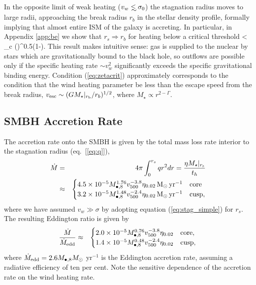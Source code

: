 \documentclass[usenatbib,fleqn]{mn2e}
\newcommand\lsim{\mathrel{\rlap{\lower4pt\hbox{\hskip1pt$\sim$}}
    \raise1pt\hbox{$<$}}}
\newcommand{\rs}{r_s}
\newcommand{\rb}{r_b}
\newcommand{\Mbheight}{M_{\bullet,8}}
\newcommand{\soi}{\rm inf}
\newcommand{\rsoi}{r_{\soi}}
\newcommand{\pyear}{{\rm yr}^{-1}}
\renewcommand{\th}{t_h}
\begin{document}
In the opposite limit of weak heating ($v_w\lsim \sigma_0$) the
stagnation radius moves to large radii, approaching the break radius
$\rb$ in the stellar density profile, formally implying that almost
entire ISM of the galaxy is accreting.  In particular, in Appendix
\ref{app:be} we show that $\rs \Rightarrow \rb$ for heating below a
critical threshold \be \zeta\equiv {} <
\zeta_c \approx \left(\frac{\rb}{\rsoi}\right)^{0.5(1-\Gamma)}.
\label{eq:zetacrit}
\ee This result makes intuitive sense: gas is supplied to the nuclear
by stars which are gravitationally bound to the black hole, so
outflows are possible only if the specific heating rate $\sim
v_{w}^{2}$ significantly exceeds the specific gravitational binding
energy.  Condition (\ref{eq:zetacrit}) approximately corresponds to
the condition that the wind heating parameter be less than the escape
speed from the break radius, $v_{\rm esc} \sim (GM_{\star}|_{r_{\rm
    b}}/r_b)^{1/2}$, where $M_{\star} \propto r^{2-\Gamma}$.

\subsection{SMBH Accretion Rate}

The accretion rate onto the SMBH is given by the total mass loss rate interior to the stagnation radius (eq.~[\ref{eq:q}]), 
\begin{eqnarray}
  \dot{M} &=& 4\pi \int_{0}^{r_{s}}q r^{2}dr = \frac{\eta M_{\star}|_{r_{\rm s}}}{\th} \nonumber \\
&\approx&
  \begin{cases}
    4.5 \times 10^{-5} M_{\bullet,8}^{1.76}
    v_{500}^{-3.8}  \eta_{0.02} \Msun \, \pyear& \text{core} \\
    3.2 \times 10^{-5} M_{\bullet,8}^{1.48} 
    v_{500}^{-2.4}  \eta_{0.02} \Msun \, \pyear  & \text{cusp}, 
  \end{cases}
  \label{eq:mdot_analytic}
\end{eqnarray}
where we have assumed $v_{w} \gg \sigma$ by adopting equation
(\ref{eq:stag_simple}) for $r_s$.  The resulting Eddington ratio is
given by
\begin{eqnarray}
\frac{\dot{M}}{\dot{M}_{\rm edd}} &\approx&
  \begin{cases}
    2.0 \times 10^{-5} M_{\bullet,8}^{0.76}
    v_{500}^{-3.8}  \eta_{0.02}   & \text{core}, \\
    1.4 \times 10^{-5} \Mbheight^{0.48} 
    v_{500}^{-2.4}  \eta_{0.02}   & \text{cusp}, 
  \end{cases}
  \label{eq:eddr_analytic}
\end{eqnarray}
where $\dot{M}_{\rm edd} = 2.6M_{\bullet,8}M_{\odot}$ yr$^{-1}$ is the
Eddington accretion rate, assuming a radiative efficiency of ten per
cent.  Note the sensitive dependence of the accretion rate on the wind
heating rate.
\end{document}
